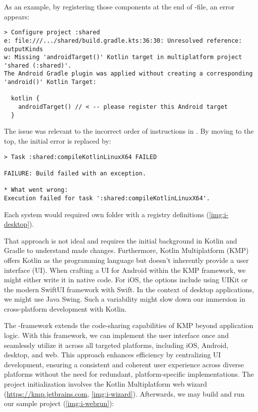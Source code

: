 As an example, by registering those components at the end of -file, an error appears:

\begin{lstlisting}[language=terminal]
> Configure project :shared
e: file:///.../shared/build.gradle.kts:36:30: Unresolved reference: outputKinds
w: Missing 'androidTarget()' Kotlin target in multiplatform project 'shared (:shared)'.
The Android Gradle plugin was applied without creating a corresponding 'android()' Kotlin Target:

  kotlin {
    androidTarget() // < -- please register this Android target
  }
\end{lstlisting}

\noindent The issue was relevant to the incorrect order of instructions in . By moving 
 to the top, the initial error is replaced by:

\begin{lstlisting}[language=terminal]
> Task :shared:compileKotlinLinuxX64 FAILED

FAILURE: Build failed with an exception.

* What went wrong:
Execution failed for task ':shared:compileKotlinLinuxX64'.
\end{lstlisting}

\noindent Each system would required own folder with a registry definitions \cite{Resa22} (\cref{img:i-desktop}).


\noindent That approach is not ideal and requires the initial background in Kotlin and Gradle to understand made changes. 
Furthermore, Kotlin Multiplatform (KMP) offers Kotlin as the programming language but doesn't inherently provide a user 
interface (UI). When crafting a UI for Android within the KMP framework, we might either write it in native code. For 
iOS, the options include using UIKit or the modern SwiftUI framework with Swift. In the context of desktop applications, 
we might use Java Swing. Such a variability might slow down our immersion in cross-platform development with Kotlin.


\noindent The -framework \cite{JetB23} extends the code-sharing capabilities of KMP beyond 
application logic. With this framework, we can implement the user interface once and seamlessly utilize it across all 
targeted platforms, including iOS, Android, desktop, and web. This approach enhances efficiency by centralizing UI 
development, ensuring a consistent and coherent user experience across diverse platforms without the need for redundant, 
platform-specific implementations. The project initialization involves the Kotlin Multiplatform web wizard
(\href{https://kmp.jetbrains.com}{https://kmp.jetbrains.com}, \cref{img:i-wizard}). Afterwards, we may build and run 
our sample project (\cref{img:i-webrun}):


